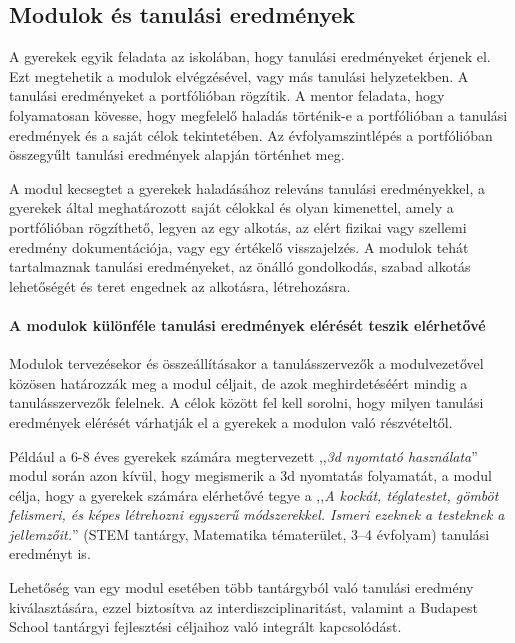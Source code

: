 \subsection{Modulok és tanulási eredmények}
\label{sec:modulok_es_tanulasi_eredmenyek}
A gyerekek egyik feladata az iskolában, hogy tanulási eredményeket érjenek el. Ezt megtehetik a modulok elvégzésével, vagy más tanulási helyzetekben. A tanulási eredményeket a portfólióban rögzítik. A mentor feladata, hogy folyamatosan kövesse, hogy megfelelő haladás történik-e a portfólióban a tanulási eredmények és a saját célok tekintetében. Az évfolyamszintlépés a portfólióban összegyűlt tanulási eredmények alapján történhet meg.

A modul kecsegtet a gyerekek haladásához releváns tanulási eredményekkel, a gyerekek által meghatározott saját célokkal és olyan kimenettel, amely a portfólióban rögzíthető, legyen az egy alkotás, az elért fizikai vagy szellemi eredmény dokumentációja, vagy egy értékelő visszajelzés. A modulok tehát tartalmaznak tanulási eredményeket, az önálló gondolkodás, szabad alkotás lehetőségét és teret engednek az alkotásra, létrehozásra.

\paragraph{A modulok különféle tanulási eredmények elérését teszik elérhetővé}

Modulok tervezésekor és összeállításakor a tanulásszervezők a modulvezetővel közösen határozzák meg a modul céljait, de azok meghirdetéséért mindig a tanulásszervezők felelnek. A célok között fel kell sorolni, hogy milyen tanulási eredmények elérését várhatják el a gyerekek a modulon való részvételtől.

Például a 6-8 éves gyerekek számára megtervezett ,,\emph{3d nyomtató használata}'' modul során azon kívül, hogy megismerik a 3d nyomtatás folyamatát, a modul célja, hogy a gyerekek számára elérhetővé tegye a ,,\emph{A kockát, téglatestet, gömböt felismeri, és képes létrehozni egyszerű módszerekkel. Ismeri ezeknek a testeknek a jellemzőit.}'' (STEM tantárgy, Matematika tématerület, 3--4 évfolyam) tanulási eredményt is.

Lehetőség van egy modul esetében több tantárgyból való tanulási eredmény kiválasztására, ezzel biztosítva az interdiszciplinaritást, valamint a Budapest School tantárgyi fejlesztési céljaihoz való integrált kapcsolódást.

